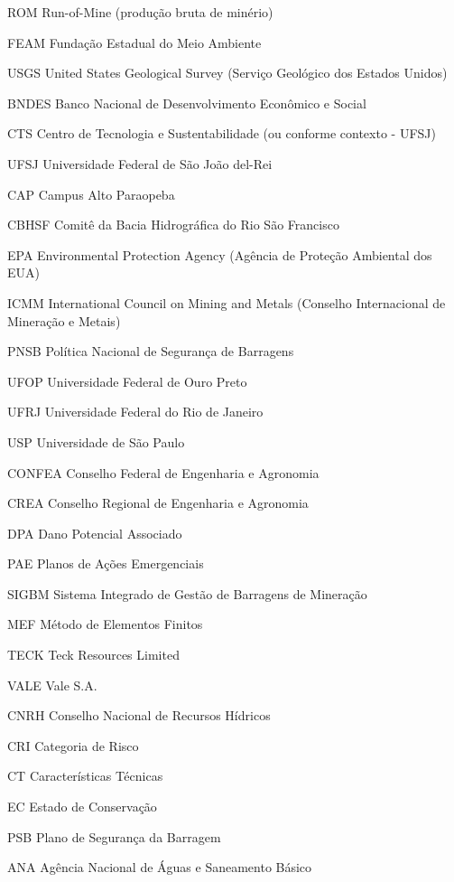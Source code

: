 \begin{siglas}
    \item[ROM] Run-of-Mine (produção bruta de minério)
    \item[FEAM] Fundação Estadual do Meio Ambiente
    \item[USGS] United States Geological Survey (Serviço Geológico dos Estados Unidos)
    \item[BNDES] Banco Nacional de Desenvolvimento Econômico e Social
    \item[CTS] Centro de Tecnologia e Sustentabilidade (ou conforme contexto - UFSJ)
    \item[UFSJ] Universidade Federal de São João del-Rei
    \item[CAP] Campus Alto Paraopeba
    \item[CBHSF] Comitê da Bacia Hidrográfica do Rio São Francisco
    \item[EPA] Environmental Protection Agency (Agência de Proteção Ambiental dos EUA)
    \item[ICMM] International Council on Mining and Metals (Conselho Internacional de Mineração e Metais)
    \item[PNSB] Política Nacional de Segurança de Barragens
    \item[UFOP] Universidade Federal de Ouro Preto
    \item[UFRJ] Universidade Federal do Rio de Janeiro
    \item[USP] Universidade de São Paulo
    \item[CONFEA] Conselho Federal de Engenharia e Agronomia
    \item[CREA] Conselho Regional de Engenharia e Agronomia
    \item[DPA] Dano Potencial Associado
    \item[PAE] Planos de Ações Emergenciais
    \item[SIGBM] Sistema Integrado de Gestão de Barragens de Mineração
    \item[MEF] Método de Elementos Finitos
    \item[TECK] Teck Resources Limited
    \item[VALE] Vale S.A.
    \item[CNRH] Conselho Nacional de Recursos Hídricos
    \item[CRI] Categoria de Risco
    \item[CT] Características Técnicas
    \item[EC] Estado de Conservação
    \item[PSB] Plano de Segurança da Barragem
    \item[ANA] Agência Nacional de Águas e Saneamento Básico

\end{siglas}
